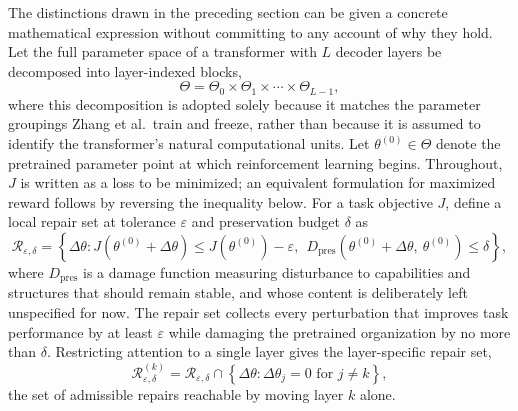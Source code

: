 \documentclass[11pt]{article}
\begin{document}
The distinctions drawn in the preceding section can be given a concrete mathematical expression without committing to any account of why they hold. Let the full parameter space of a transformer with $L$ decoder layers be decomposed into layer-indexed blocks,
\[
\Theta = \Theta_0 \times \Theta_1 \times \cdots \times \Theta_{L-1},
\]
where this decomposition is adopted solely because it matches the parameter groupings Zhang et al.\ train and freeze, rather than because it is assumed to identify the transformer's natural computational units. Let $\theta^{(0)} \in \Theta$ denote the pretrained parameter point at which reinforcement learning begins. Throughout, $J$ is written as a loss to be minimized; an equivalent formulation for maximized reward follows by reversing the inequality below. For a task objective $J$, define a local repair set at tolerance $\varepsilon$ and preservation budget $\delta$ as
\[
\mathcal{R}_{\varepsilon,\delta} = \left\{ \Delta\theta : J\!\left(\theta^{(0)} + \Delta\theta\right) \leq J\!\left(\theta^{(0)}\right) - \varepsilon,\ \ D_{\mathrm{pres}}\!\left(\theta^{(0)} + \Delta\theta,\ \theta^{(0)}\right) \leq \delta \right\},
\]
where $D_{\mathrm{pres}}$ is a damage function measuring disturbance to capabilities and structures that should remain stable, and whose content is deliberately left unspecified for now. The repair set collects every perturbation that improves task performance by at least $\varepsilon$ while damaging the pretrained organization by no more than $\delta$. Restricting attention to a single layer gives the layer-specific repair set,
\[
\mathcal{R}^{(k)}_{\varepsilon,\delta} = \mathcal{R}_{\varepsilon,\delta} \cap \left\{ \Delta\theta : \Delta\theta_j = 0 \text{ for } j \neq k \right\},
\]
the set of admissible repairs reachable by moving layer $k$ alone.
\end{document}
